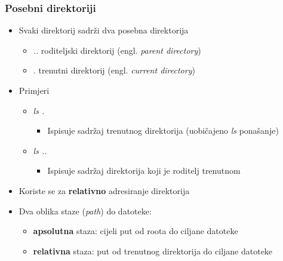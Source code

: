 \documentclass{beamer}
\begin{document}
\begin{frame}[t]
\frametitle{Posebni direktoriji}
\begin{itemize}
  \item Svaki direktorij sadrži dva posebna direktorija
  \begin{itemize}
    \item \textit{..} roditeljski direktorij (engl. \textit{parent directory})
    \item \textit{.} trenutni direktorij (engl. \textit{current directory})
  \end{itemize}
  \item Primjeri
  \begin{itemize}
    \item \textit{ls . } 
    \begin{itemize}
      \item Ispisuje sadržaj trenutnog direktorija (uobičajeno \textit{ls} ponašanje)
    \end{itemize}
    \item \textit{ls .. }
    \begin{itemize}
      \item Ispisuje sadržaj direktorija koji je roditelj trenutnom
    \end{itemize}
  \end{itemize}
  \item Koriste se za \textbf{relativno} adresiranje direktorija
  \vfill
  \item Dva oblika staze (\textit{path}) do datoteke:
  \begin{itemize}
    \item \textbf{apsolutna} staza: cijeli put od roota do ciljane datoteke
    \item \textbf{relativna} staza: put od trenutnog direktorija do ciljane datoteke
  \end{itemize}
\end{itemize}
\end{frame}
\end{document}
